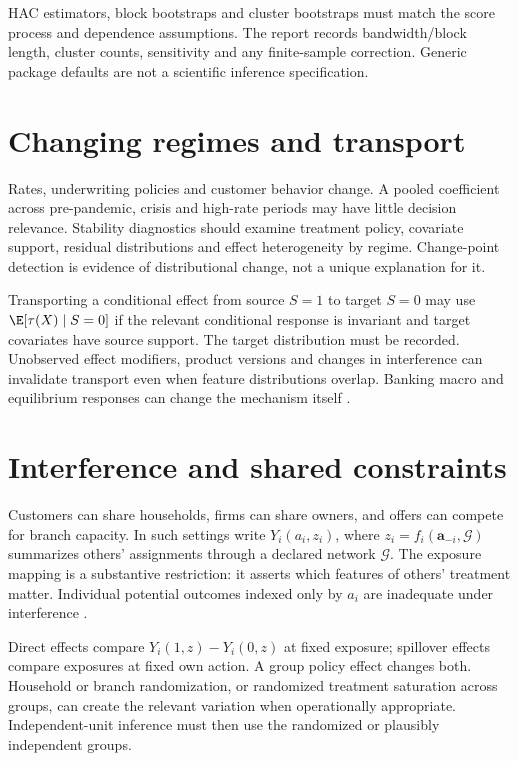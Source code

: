 HAC estimators, block bootstraps and cluster bootstraps must match the score
process and dependence assumptions. The report records bandwidth/block
length, cluster counts, sensitivity and any finite-sample correction.
Generic package defaults are not a scientific inference specification.

\section{Changing regimes and transport}
Rates, underwriting policies and customer behavior change. A pooled
coefficient across pre-pandemic, crisis and high-rate periods may have little
decision relevance. Stability diagnostics should examine treatment policy,
covariate support, residual distributions and effect heterogeneity by regime.
Change-point detection is evidence of distributional change, not a unique
explanation for it.

Transporting a conditional effect from source $S=1$ to target $S=0$
may use $\E[\tau(X)\mid S=0]$ if the relevant conditional response is
invariant and target covariates have source support. The target distribution
must be recorded. Unobserved effect modifiers, product versions and changes
in interference can invalidate transport even when feature distributions
overlap. Banking macro and equilibrium responses can change the mechanism
itself \citep{beraja2019,benetton2021}.

\section{Interference and shared constraints}
Customers can share households, firms can share owners, and offers can
compete for branch capacity. In such settings write
$Y_i(a_i,z_i)$, where $z_i=f_i(\bm a_{-i},\mathcal G)$ summarizes
others' assignments through a declared network $\mathcal G$.
The exposure mapping is a substantive restriction: it asserts which
features of others' treatment matter. Individual potential outcomes
indexed only by $a_i$ are inadequate under interference
\citep{hernan2020}.

Direct effects compare $Y_i(1,z)-Y_i(0,z)$ at fixed exposure;
spillover effects compare exposures at fixed own action.
A group policy effect changes both. Household or branch randomization,
or randomized treatment saturation across groups, can create the relevant
variation when operationally appropriate. Independent-unit inference must
then use the randomized or plausibly independent groups.

